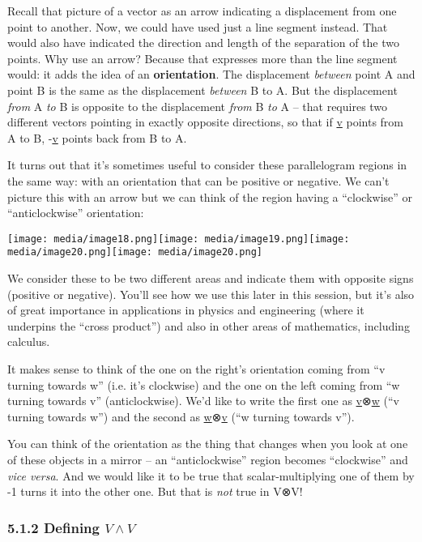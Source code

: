 \documentclass[oneside,english]{amsbook}
\numberwithin{section}{chapter}
\theoremstyle{plain}
\theoremstyle{definition}
\begin{document}
Recall that picture of a vector as an arrow indicating a displacement
from one point to another. Now, we could have used just a line segment
instead. That would also have indicated the direction and length of the
separation of the two points. Why use an arrow? Because that expresses
more than the line segment would: it adds the idea of an
\textbf{orientation}. The displacement \emph{between} point A and point
B is the same as the displacement \emph{between} B to A. But the
displacement \emph{from} A \emph{to} B is opposite to the displacement
\emph{from} B \emph{to} A -- that requires two different vectors
pointing in exactly opposite directions, so that if \ul{v} points from A
to B, -\ul{v} points back from B to A.

It turns out that it's sometimes useful to consider these parallelogram
regions in the same way: with an orientation that can be positive or
negative. We can't picture this with an arrow but we can think of the
region having a ``clockwise'' or ``anticlockwise'' orientation:

\texttt{[image: media/image18.png]}\texttt{[image: media/image19.png]}\texttt{[image: media/image20.png]}\texttt{[image: media/image20.png]}

We consider these to be two different areas and indicate them with
opposite signs (positive or negative). You'll see how we use this later
in this session, but it's also of great importance in applications in
physics and engineering (where it underpins the ``cross product'') and
also in other areas of mathematics, including calculus.

It makes sense to think of the one on the right's orientation coming
from ``v turning towards w'' (i.e. it's clockwise) and the one on the
left coming from ``w turning towards v'' (anticlockwise). We'd like to
write the first one as \ul{v}⊗\ul{w} (``v turning towards w'') and the
second as \ul{w}⊗\ul{v} (``w turning towards v'').

You can think of the orientation as the thing that changes when you look
at one of these objects in a mirror -- an ``anticlockwise'' region
becomes ``clockwise'' and \emph{vice versa}. And we would like it to be
true that scalar-multiplying one of them by -1 turns it into the other
one. But that is \emph{not} true in V⊗V!

\subsubsection{\texorpdfstring{5.1.2 Defining
		\(V \land V\)}{5.1.2 Defining V \textbackslash land V}}\label{defining-v-land-v}
\end{document}
